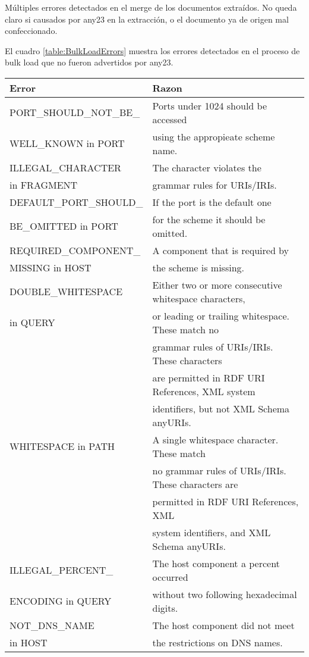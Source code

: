 \noindent Múltiples errores detectados en el merge de los documentos extraídos. No queda claro si causados por any23 en la extracción, o el documento ya de origen 
mal confeccionado. 

El cuadro \ref{table:BulkLoadErrors} muestra los errores detectados en el proceso de bulk load que no fueron advertidos por any23.\\
\begin{table}[h]
\begin{tabular}{| l | l | }\hline
Error & Razon \\\hline
PORT\_SHOULD\_NOT\_BE\_& Ports under 1024 should be accessed \\ WELL\_KNOWN  in PORT  & using the appropieate scheme name. \\\hline
ILLEGAL\_CHARACTER & The character violates the \\  in FRAGMENT & grammar rules for URIs/IRIs.\\\hline
DEFAULT\_PORT\_SHOULD\_& If the port is the default one \\ BE\_OMITTED in PORT  & for the scheme it should be omitted. \\\hline
REQUIRED\_COMPONENT\_& A component that is required by \\ MISSING in HOST & the scheme is missing.\\\hline
DOUBLE\_WHITESPACE& Either two or more consecutive whitespace characters, \\  in QUERY  & or leading or trailing whitespace. These match no \\ & grammar rules of URIs/IRIs. These characters \\ & are permitted in RDF URI References, XML system \\ & identifiers, but not XML Schema anyURIs.\\\hline
WHITESPACE in PATH & A single whitespace character. These match \\ & no grammar rules of URIs/IRIs. These characters are \\ & permitted in RDF URI References, XML \\ & system identifiers, and XML Schema anyURIs.\\\hline
ILLEGAL\_PERCENT\_& The host component a percent occurred \\ ENCODING in QUERY  & without two following hexadecimal digits.\\\hline
NOT\_DNS\_NAME& The host component did not meet \\  in HOST  & the restrictions on DNS names.\\\hline

\end{tabular}
\end{table}
